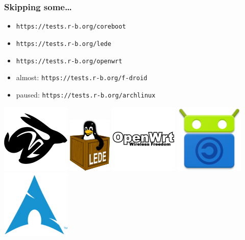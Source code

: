 \documentclass[14pt]{beamer}
\begin{document}
\begin{frame}
 \frametitle{Skipping some…}
 \begin{itemize}
  \item \texttt{https://tests.r-b.org/coreboot}
  \item \texttt{https://tests.r-b.org/lede}
  \item \texttt{https://tests.r-b.org/openwrt}
  \item almost: \texttt{https://tests.r-b.org/f-droid}
  \item paused: \texttt{https://tests.r-b.org/archlinux}
 \end{itemize}
 \begin{center}
  \includegraphics[height=0.13\paperheight]{images/coreboot.png}
  \hspace{0.05\paperwidth}
  \includegraphics[height=0.15\paperheight]{images/lede.png}
  \hspace{0.05\paperwidth}
  \includegraphics[height=0.3\paperheight]{images/openwrt.png}
  \hspace{0.05\paperwidth}
  \includegraphics[height=0.13\paperheight]{images/f-droid.png}
  \hspace{0.05\paperwidth}
  \includegraphics[height=0.13\paperheight]{images/archlinux.png}
\end{center}
\end{frame}
\end{document}

